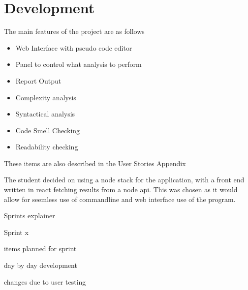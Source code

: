 \section{Development}
The main features of the project are as follows
\begin{itemize}
    \item Web Interface with pseudo code editor
    \item Panel to control what analysis to perform
    \item Report Output
    \item Complexity analysis
    \item Syntactical analysis
    \item Code Smell Checking
    \item Readability checking
\end{itemize}

These items are also described in the User Stories Appendix

The student decided on using a node stack for the application, with a front end written in react fetching results from a node api.
\newline
This was chosen as it would allow for seemless use of commandline and web interface use of the program.


Sprints explainer

Sprint x 

items planned for sprint

day by day development

changes due to user testing